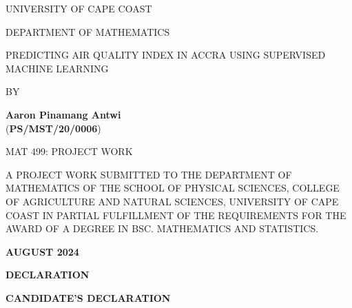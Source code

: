 \documentclass{book}
\numberwithin{equation}{section}
\numberwithin{figure}{section}
\begin{document}
\thispagestyle{empty}
\begin{center}
 UNIVERSITY OF CAPE COAST
\end{center}
\begin{center}
 DEPARTMENT OF MATHEMATICS
\end{center}
\vspace{1.0cm}
\begin{center}
PREDICTING AIR QUALITY INDEX IN ACCRA USING SUPERVISED MACHINE LEARNING 
\end{center}
\vspace{0.7cm}
\begin{center}
 BY
\end{center}
\vspace{0.5cm}
\begin{center}
\textbf{Aaron Pinamang Antwi} \\
(\textbf{PS/MST/20/0006})
\end{center}
\vspace{0.5cm}
\begin{center}
 MAT 499: PROJECT WORK
\end{center}
\vspace{0.5cm}
\begin{flushleft}
A PROJECT WORK SUBMITTED TO THE DEPARTMENT OF MATHEMATICS OF THE SCHOOL OF PHYSICAL SCIENCES, COLLEGE OF AGRICULTURE AND NATURAL SCIENCES, UNIVERSITY OF CAPE COAST IN PARTIAL FULFILLMENT OF THE REQUIREMENTS FOR THE AWARD OF A DEGREE IN BSC. MATHEMATICS AND STATISTICS.
\end{flushleft}
\vspace{0.5cm}
\begin{center}
	\textbf{ AUGUST 2024}
\end{center}
\newpage
{}
%
\begin{center}
 \textbf{DECLARATION}
\end{center}

\begin{center}
\textbf{CANDIDATE'S DECLARATION}
\end{center}
\end{document}
